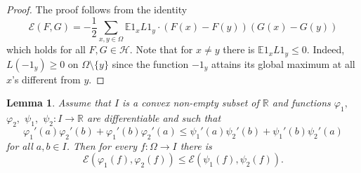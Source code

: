 \documentclass[11pt]{amsart}
\newcommand{\R}{\mathbb{R}}
\newcommand{\E}{\mathbb{E}}
\newcommand{\1}{\mathbf{1}}
\def\R{{\mathbb R}}
\def\e{{\mathcal{E}}}
\def\E{{\mathbb E}}
\def\H{{\mathcal{H}}}
\theoremstyle{definition}
\theoremstyle{plain}
\newtheorem{lemma}[example]{Lemma}
\theoremstyle{remark}
\numberwithin{equation}{section}
\begin{document}
\begin{proof}

The proof follows from the identity 
\begin{equation}\label{eq:dir_identity}
\e(F,G)=-\frac{1}{2}\sum_{x, y \in \Omega}\E 1_{x}L1_{y} \cdot \left(F(x)-F(y)\right)\left(G(x)-G(y)\right)
\end{equation}
which holds for all $F, G \in \H$. Note that for $x \neq y$ there is $\E 1_{x}L1_{y} \leq 0$. Indeed, 
$L(-1_{y}) \geq 0$ on $\Omega \setminus \{ y\}$ since the function $-1_{y}$ attains its global maximum
at all $x$'s different from $y$.

\end{proof}

\begin{lemma} \label{comp2}
Assume that $I$ is a convex non-empty subset of $\R$ and functions
$\varphi_{1},$ $\varphi_{2},$ $\psi_{1},$ $\psi_{2}:I \rightarrow \R$ are differentiable and such that
\[
\varphi_{1}'(a)\varphi_{2}'(b)+\varphi_{1}'(b)\varphi_{2}'(a)
\leq
\psi_{1}'(a)\psi_{2}'(b)+\psi_{1}'(b)\psi_{2}'(a)
\]
for all $a, b \in I$. Then for every $f:\Omega \rightarrow I$
there is
\[
\e(\varphi_{1}(f),\varphi_{2}(f)) \leq
\e(\psi_{1}(f),\psi_{2}(f)).
\]
\end{lemma}
\end{document}
